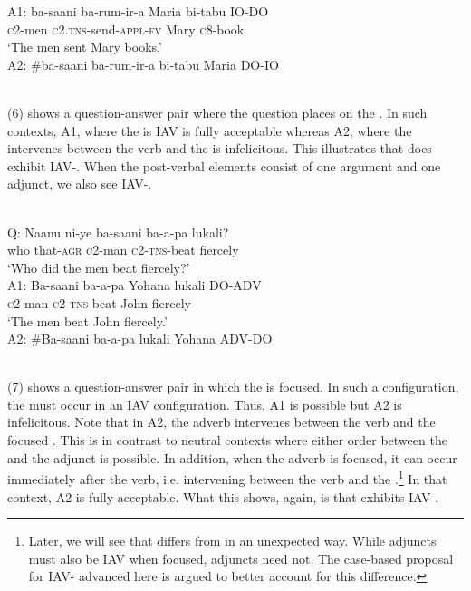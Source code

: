 \documentclass[output=paper
,newtxmath
,modfonts
,nonflat]{langsci/langscibook}
\begin{document}
A1: \gll ba-saani    ba-rum-ir-a            Maria  bi-tabu       IO-DO \\
	\textsc{c}2-men     \textsc{c}2.\textsc{tns}{}-send-\textsc{appl}{}-\textsc{fv}   Mary   \textsc{c}8-book \\

\glt \-\hspace{0.5cm}`The men sent Mary books.'\\

A2: \gll \#ba-saani  ba-rum-ir-a            bi-tabu   Maria         DO-IO \\
\\
\z

(6) shows a question-answer pair where the question places  on the . In such contexts, A1, where the  is IAV is fully acceptable whereas A2, where the  intervenes between the verb and the  is infelicitous. This illustrates that  does exhibit IAV-. When the post-verbal elements consist of one argument and one adjunct, we also see IAV-.

\ea\label{ex:selvanathan:7}
\\

Q: \gll Naanu  ni-ye    ba-saani   ba-a-pa     lukali?\\
who  that-\textsc{agr}   \textsc{c}2-man   \textsc{c}2-\textsc{tns}{}-beat  fiercely\\

\glt \-\hspace{0.5cm}`Who did the men beat fiercely?'\\

A1: \gll Ba-saani  ba-a-pa  Yohana      lukali DO-ADV\\
	\textsc{c}2-man   \textsc{c}2-\textsc{tns}{}-beat  John          fiercely\\
\glt \-\hspace{0.5cm}`The men beat John fiercely.'\\

A2: \gll \#Ba-saani  ba-a-pa  lukali        Yohana ADV-DO \\
	\\
\z

(7) shows a question-answer pair in which the  is focused. In such a configuration, the  must occur in an IAV configuration. Thus, A1 is possible but A2 is infelicitous. Note that in A2, the adverb intervenes between the verb and the focused . This is in contrast to neutral contexts where either order between the  and the adjunct is possible. In addition, when the adverb is focused, it can occur immediately after the verb, i.e. intervening between the verb and the .\footnote{Later, we will see that  differs from  in an unexpected way. While  adjuncts must also be IAV when focused,  adjuncts need not. The case-based proposal for IAV- advanced here is argued to better account for this difference.}  In that context, A2 is fully acceptable. What this shows, again, is that  exhibits IAV-.
\end{document}

